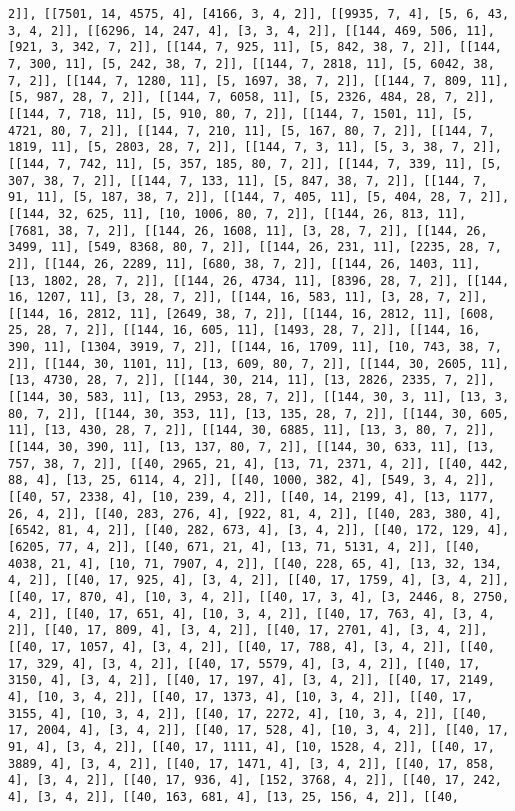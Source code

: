 \documentclass[12pt,fleqn]{article}\usepackage{../../common}
\begin{document}
\begin{verbatim}
2]], [[7501, 14, 4575, 4], [4166, 3, 4, 2]], [[9935, 7, 4], [5, 6, 43, 3, 4, 2]], [[6296, 14, 247, 4], [3, 3, 4, 2]], [[144, 469, 506, 11], [921, 3, 342, 7, 2]], [[144, 7, 925, 11], [5, 842, 38, 7, 2]], [[144, 7, 300, 11], [5, 242, 38, 7, 2]], [[144, 7, 2818, 11], [5, 6042, 38, 7, 2]], [[144, 7, 1280, 11], [5, 1697, 38, 7, 2]], [[144, 7, 809, 11], [5, 987, 28, 7, 2]], [[144, 7, 6058, 11], [5, 2326, 484, 28, 7, 2]], [[144, 7, 718, 11], [5, 910, 80, 7, 2]], [[144, 7, 1501, 11], [5, 4721, 80, 7, 2]], [[144, 7, 210, 11], [5, 167, 80, 7, 2]], [[144, 7, 1819, 11], [5, 2803, 28, 7, 2]], [[144, 7, 3, 11], [5, 3, 38, 7, 2]], [[144, 7, 742, 11], [5, 357, 185, 80, 7, 2]], [[144, 7, 339, 11], [5, 307, 38, 7, 2]], [[144, 7, 133, 11], [5, 847, 38, 7, 2]], [[144, 7, 91, 11], [5, 187, 38, 7, 2]], [[144, 7, 405, 11], [5, 404, 28, 7, 2]], [[144, 32, 625, 11], [10, 1006, 80, 7, 2]], [[144, 26, 813, 11], [7681, 38, 7, 2]], [[144, 26, 1608, 11], [3, 28, 7, 2]], [[144, 26, 3499, 11], [549, 8368, 80, 7, 2]], [[144, 26, 231, 11], [2235, 28, 7, 2]], [[144, 26, 2289, 11], [680, 38, 7, 2]], [[144, 26, 1403, 11], [13, 1802, 28, 7, 2]], [[144, 26, 4734, 11], [8396, 28, 7, 2]], [[144, 16, 1207, 11], [3, 28, 7, 2]], [[144, 16, 583, 11], [3, 28, 7, 2]], [[144, 16, 2812, 11], [2649, 38, 7, 2]], [[144, 16, 2812, 11], [608, 25, 28, 7, 2]], [[144, 16, 605, 11], [1493, 28, 7, 2]], [[144, 16, 390, 11], [1304, 3919, 7, 2]], [[144, 16, 1709, 11], [10, 743, 38, 7, 2]], [[144, 30, 1101, 11], [13, 609, 80, 7, 2]], [[144, 30, 2605, 11], [13, 4730, 28, 7, 2]], [[144, 30, 214, 11], [13, 2826, 2335, 7, 2]], [[144, 30, 583, 11], [13, 2953, 28, 7, 2]], [[144, 30, 3, 11], [13, 3, 80, 7, 2]], [[144, 30, 353, 11], [13, 135, 28, 7, 2]], [[144, 30, 605, 11], [13, 430, 28, 7, 2]], [[144, 30, 6885, 11], [13, 3, 80, 7, 2]], [[144, 30, 390, 11], [13, 137, 80, 7, 2]], [[144, 30, 633, 11], [13, 757, 38, 7, 2]], [[40, 2965, 21, 4], [13, 71, 2371, 4, 2]], [[40, 442, 88, 4], [13, 25, 6114, 4, 2]], [[40, 1000, 382, 4], [549, 3, 4, 2]], [[40, 57, 2338, 4], [10, 239, 4, 2]], [[40, 14, 2199, 4], [13, 1177, 26, 4, 2]], [[40, 283, 276, 4], [922, 81, 4, 2]], [[40, 283, 380, 4], [6542, 81, 4, 2]], [[40, 282, 673, 4], [3, 4, 2]], [[40, 172, 129, 4], [6205, 77, 4, 2]], [[40, 671, 21, 4], [13, 71, 5131, 4, 2]], [[40, 4038, 21, 4], [10, 71, 7907, 4, 2]], [[40, 228, 65, 4], [13, 32, 134, 4, 2]], [[40, 17, 925, 4], [3, 4, 2]], [[40, 17, 1759, 4], [3, 4, 2]], [[40, 17, 870, 4], [10, 3, 4, 2]], [[40, 17, 3, 4], [3, 2446, 8, 2750, 4, 2]], [[40, 17, 651, 4], [10, 3, 4, 2]], [[40, 17, 763, 4], [3, 4, 2]], [[40, 17, 809, 4], [3, 4, 2]], [[40, 17, 2701, 4], [3, 4, 2]], [[40, 17, 1057, 4], [3, 4, 2]], [[40, 17, 788, 4], [3, 4, 2]], [[40, 17, 329, 4], [3, 4, 2]], [[40, 17, 5579, 4], [3, 4, 2]], [[40, 17, 3150, 4], [3, 4, 2]], [[40, 17, 197, 4], [3, 4, 2]], [[40, 17, 2149, 4], [10, 3, 4, 2]], [[40, 17, 1373, 4], [10, 3, 4, 2]], [[40, 17, 3155, 4], [10, 3, 4, 2]], [[40, 17, 2272, 4], [10, 3, 4, 2]], [[40, 17, 2004, 4], [3, 4, 2]], [[40, 17, 528, 4], [10, 3, 4, 2]], [[40, 17, 91, 4], [3, 4, 2]], [[40, 17, 1111, 4], [10, 1528, 4, 2]], [[40, 17, 3889, 4], [3, 4, 2]], [[40, 17, 1471, 4], [3, 4, 2]], [[40, 17, 858, 4], [3, 4, 2]], [[40, 17, 936, 4], [152, 3768, 4, 2]], [[40, 17, 242, 4], [3, 4, 2]], [[40, 163, 681, 4], [13, 25, 156, 4, 2]], [[40, 
\end{verbatim}
\end{document}
